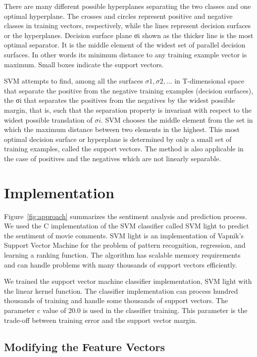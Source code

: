 \documentclass[conference]{IEEEtran}
\begin{document}
There are many different possible hyperplanes separating the two classes and one optimal hyperplane.
The crosses and circles represent positive and negative classes in training vectors, respectively, while
the lines represent decision surfaces or the hyperplanes. Decision surface plane σi shown as the thicker
line is the most optimal separator. It is the middle element of the widest set of parallel decision
surfaces. In other words its minimum distance to any training example vector is maximum. Small
boxes indicate the support vectors.

SVM attempts to find, among all the surfaces $σ1 , σ2 , . . .$ in T-dimensional space that separate the
positive from the negative training examples (decision surfaces), the σi that separates the positives
from the negatives by the widest possible margin, that is, such that the separation property is invariant with respect to the widest possible translation of $σi$. SVM chooses the middle element from the set in which the maximum distance between two elements in the highest. This most optimal decision surface or hyperplane is determined by only a small set of training examples, called the support vectors. The method is also applicable in the case of positives and the negatives which are not linearly separable.


\section{Implementation}

Figure~\ref{fig:approach} summarizes the sentiment analysis and prediction process. We used the C implementation of the SVM classifier called SVM light \cite{SVMlight} to predict the sentiment of movie comments. SVM light is an implementation of Vapnik's Support Vector Machine \cite{V95} for the problem of pattern recognition, regression, and learning a ranking function. The algorithm has scalable memory requirements and can handle problems with many thousands of support vectors efficiently.

We trained the support vector machine classifier implementation, SVM light with the linear kernel
function. The classifier implementation can process hundred thousands of training and handle some
thousands of support vectors. The parameter c value of 20.0 is used in the classifier training. This parameter is the trade-off between training error and the support vector margin.


\subsection{Modifying the Feature Vectors}
\end{document}
